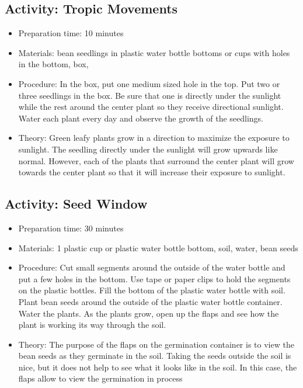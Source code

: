 \subsection{Activity: Tropic Movements}
\begin{itemize}
\item{Preparation time: 10 minutes}
\item{Materials: bean seedlings in plastic water bottle bottoms or cups with holes in the bottom, box,}
\item{Procedure: In the box, put one medium sized hole in the top. Put two or three seedlings in the box. Be sure that one is directly under the sunlight while the rest around the center plant so they receive directional sunlight. Water each plant every day and observe the growth of the seedlings.}
\item{Theory: Green leafy plants grow in a direction to maximize the exposure to sunlight. The seedling directly under the sunlight will grow upwards like normal. However, each of the plants that surround the center plant will grow towards the center plant so that it will increase their exposure to sunlight. }
\end{itemize}

\subsection{Activity: Seed Window}
\begin{itemize}
\item{Preparation time: 30 minutes }
\item{Materials: 1 plastic cup or plastic water bottle bottom, soil, water, bean seeds}
\item{Procedure: Cut small segments around the outside of the water bottle and put a few holes in the bottom. Use tape or paper clips to hold the segments on the plastic bottles. Fill the bottom of the plastic water bottle with soil. Plant bean seeds around the outside of the plastic water bottle container. Water the plants. As the plants grow, open up the flaps and see how the plant is working its way through the soil.}
\item{Theory: The purpose of the flaps on the germination container is to view the bean seeds as they germinate in the soil. Taking the seeds outside the soil is nice, but it does not help to see what it looks like in the soil. In this case, the flaps allow to view the germination in process}
\end{itemize}

